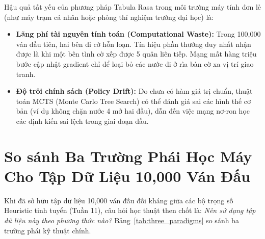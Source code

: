 \documentclass[11pt,a4paper]{report}
\begin{document}
Hậu quả tất yếu của phương pháp Tabula Rasa trong môi trường máy tính đơn lẻ (như máy trạm cá nhân hoặc phòng thí nghiệm trường đại học) là:
\begin{itemize}
    \item \textbf{Lãng phí tài nguyên tính toán (Computational Waste):} Trong 100,000 ván đầu tiên, hai bên đi cờ hỗn loạn. Tín hiệu phần thưởng duy nhất nhận được là khi một bên tình cờ xếp được 5 quân liên tiếp. Mạng mất hàng triệu bước cập nhật gradient chỉ để loại bỏ các nước đi ở rìa bàn cờ xa vị trí giao tranh.
    \item \textbf{Độ trôi chính sách (Policy Drift):} Do chưa có hàm giá trị chuẩn, thuật toán MCTS (Monte Carlo Tree Search) có thể đánh giá sai các hình thế cơ bản (ví dụ không chặn nước 4 mở hai đầu), dẫn đến việc mạng nơ-ron học các định kiến sai lệch trong giai đoạn đầu.
\end{itemize}

\section{So sánh Ba Trường Phái Học Máy Cho Tập Dữ Liệu 10,000 Ván Đấu}

Khi đã sở hữu tập dữ liệu 10,000 ván đấu đối kháng giữa các bộ trọng số Heuristic tinh tuyển (Tuần 11), câu hỏi học thuật then chốt là: \textit{Nên sử dụng tập dữ liệu này theo phương thức nào?} Bảng~\ref{tab:three_paradigms} so sánh ba trường phái kỹ thuật chính.
\end{document}
